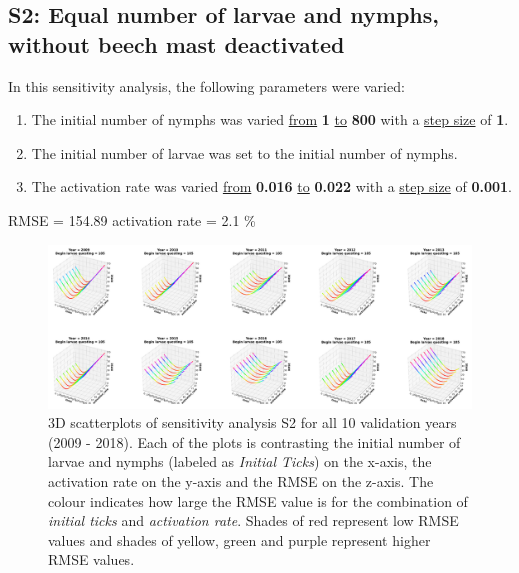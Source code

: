 \documentclass[a4paper, 11pt]{scrartcl}
\begin{document}
\newpage
\subsection{S2: Equal number of larvae and nymphs, without beech mast deactivated}
In this sensitivity analysis, the following parameters were varied:

\begin{enumerate}
\item The initial number of nymphs was varied \underline{from} \textbf{1} \underline{to} \textbf{800} with a \underline{step size} of \textbf{1}.
\item The initial number of larvae was set to the initial number of nymphs.
\item The activation rate was varied \underline{from} \textbf{0.016} \underline{to} \textbf{0.022} with a \underline{step size} of \textbf{0.001}.
\end{enumerate}

RMSE = 154.89
activation rate = 2.1 \%

\begin{figure}[h!]
\centering
\includegraphics[width=\linewidth]{figures/initial_ticks_without_beech_error.png}
\caption{3D scatterplots of sensitivity analysis S2 for all 10 validation years (2009 - 2018). Each of the plots is contrasting the initial number of larvae and nymphs
(labeled as \textit{Initial Ticks}) on the x-axis, the activation rate on the y-axis and the RMSE on the z-axis. The colour indicates how large the RMSE value is for the
combination of \textit{initial ticks} and \textit{activation rate}. Shades of red represent low RMSE values and shades of yellow, green and purple represent higher RMSE values.}
\label{fig:initial_ticks_without_beech_error}
\end{figure}
\end{document}
